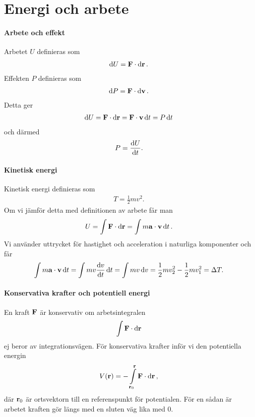 \section{Energi och arbete}

\paragraph{Arbete och effekt}
Arbetet $U$ definieras som
\begin{align*}
	\dd{U} = \vb{F}\cdot\dd{\vb{r}}.
\end{align*}
Effekten $P$ definieras som
\begin{align*}
	\dd{P} = \vb{F}\cdot\dd{\vb{v}}.
\end{align*}
Detta ger
\begin{align*}
	\dd{U} = \vb{F}\cdot\dd{\vb{r}} = \vb{F}\cdot\vb{v}\dd{t} = P\dd{t}
\end{align*}
och därmed
\begin{align*}
	P = \dv{U}{t}.
\end{align*}

\paragraph{Kinetisk energi}
Kinetisk energi definieras som
\begin{align*}
	T = \frac{1}{2}mv^2.
\end{align*}
Om vi jämför detta med definitionen av arbete får man
\begin{align*}
	U = \int\vb{F}\cdot\dd{\vb{r}} = \int m\vb{a}\cdot\vb{v}\dd{t}.
\end{align*}
Vi använder uttrycket för hastighet och acceleration i naturliga komponenter och får
\begin{align*}
	\int m\vb{a}\cdot\vb{v}\dd{t} = \int mv\dv{v}{t}\dd{t} = \int mv\dd{v} = \frac{1}{2}mv_2^2 - \frac{1}{2}mv_1^2 = \Delta T.
\end{align*}

\paragraph{Konservativa krafter och potentiell energi}
En kraft $\vb{F}$ är konservativ om arbetsintegralen
\begin{align*}
	\int\vb{F}\cdot\dd{\vb{r}}
\end{align*}
ej beror av integrationsvägen. För konservativa krafter inför vi den potentiella energin
\begin{align*}
	V(\vb{r}) = -\int\limits_{\vb{r}_0}^{\vb{r}}\vb{F}\cdot\dd{\vb{r}},
\end{align*}
där $\vb{r}_0$ är ortsvektorn till en referenspunkt för potentialen. För en sådan är arbetet kraften gör längs med en sluten väg lika med $0$.